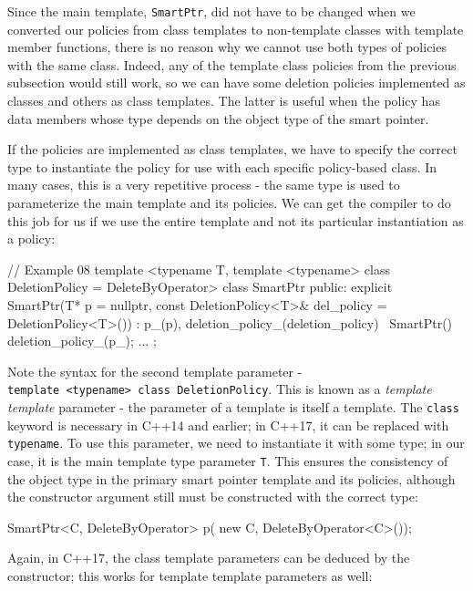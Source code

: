 Since the main template, \texttt{SmartPtr}, did not have to be changed when we converted our policies from class templates to non-template classes with template member functions, there is no reason why we cannot use both types of policies with the same class. Indeed, any of the template class policies from the previous subsection would still work, so we can have some deletion policies implemented as classes and others as class templates. The latter is useful when the policy has data members whose type depends on the object type of the smart pointer.

If the policies are implemented as class templates, we have to specify the correct type to instantiate the policy for use with each specific policy-based class. In many cases, this is a very repetitive process - the same type is used to parameterize the main template and its policies. We can get the compiler to do this job for us if we use the entire template and not its particular instantiation as a policy:

\begin{code}
// Example 08
template <typename T,
          template <typename> class DeletionPolicy =
                                    DeleteByOperator>
class SmartPtr {
  public:
  explicit SmartPtr(T* p = nullptr,
    const DeletionPolicy<T>& del_policy =
                             DeletionPolicy<T>())
  : p_(p), deletion_policy_(deletion_policy)
  {}
  ~SmartPtr() {
    deletion_policy_(p_);
  }
  ...
};
\end{code}

Note the syntax for the second template parameter - \texttt{template\ \textless{}typename\textgreater{}\ class\ DeletionPolicy}. This is known as a \emph{template template} parameter - the parameter of a template is itself a template. The \texttt{class} keyword is necessary in C++14 and earlier; in C++17, it can be replaced with \texttt{typename}. To use this parameter, we need to instantiate it with some type; in our case, it is the main template type parameter \texttt{T}. This ensures the consistency of the object type in the primary smart pointer template and its policies, although the constructor argument still must be constructed with the correct type:

\begin{code}
SmartPtr<C, DeleteByOperator> p(
  new C, DeleteByOperator<C>());
\end{code}

Again, in C++17, the class template parameters can be deduced by the constructor; this works for template template parameters as well:

